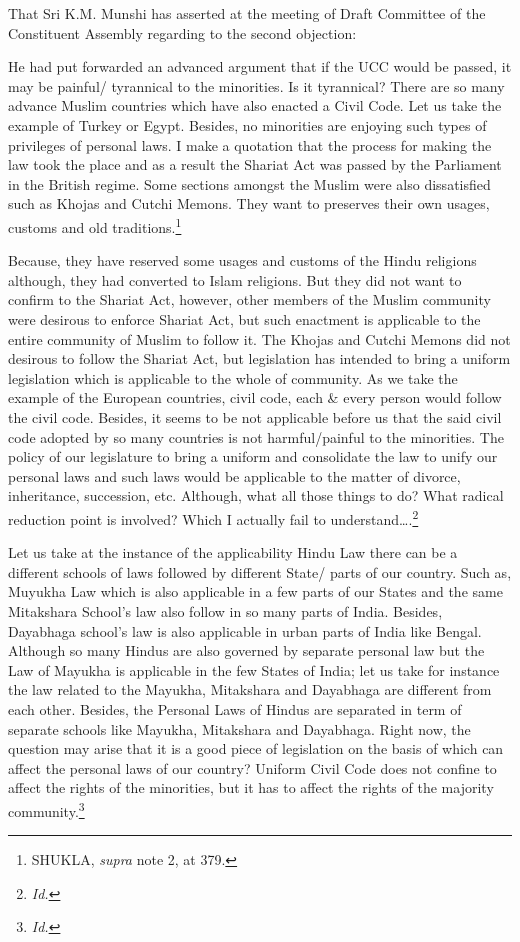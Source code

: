 \begin{multicols}{2}
\noi
That Sri K.M. Munshi has asserted at the meeting of Draft Committee of the Constituent
Assembly regarding to the second objection: 

\noi
He had put forwarded an advanced argument that if the UCC would be passed, it may be
painful/ tyrannical to the minorities. Is it tyrannical? There are so many advance Muslim
countries which have also enacted a Civil Code. Let us take the example of Turkey or Egypt.
Besides, no minorities are enjoying such types of privileges of personal laws. I make a
quotation that the process for making the law took the place and as a result the Shariat Act
was passed by the Parliament in the British regime. Some sections amongst the Muslim were
also dissatisfied such as Khojas and Cutchi Memons. They want to preserves their own
usages, customs and old traditions.\footnote{SHUKLA, {\it supra} note 2, at 379.}

\noi
Because, they have reserved some usages and customs of the Hindu religions although, they
had converted to Islam religions. But they did not want to confirm to the Shariat Act,
however, other members of the Muslim community were desirous to enforce Shariat Act, but
such enactment is applicable to the entire community of Muslim to follow it. The Khojas and
Cutchi Memons did not desirous to follow the Shariat Act, but legislation has intended to
bring a uniform legislation which is applicable to the whole of community. As we take the
example of the European countries, civil code, each \& every person would follow the civil
code. Besides, it seems to be not applicable before us that the said civil code adopted by so
many countries is not harmful/painful to the minorities. The policy of our legislature to bring
a uniform and consolidate the law to unify our personal laws and such laws would be
applicable to the matter of divorce, inheritance, succession, etc. Although, what all those things to do? What radical reduction point is involved? Which I actually fail to
understand….\footnote{\it Id.} 

\noi
Let us take at the instance of the applicability Hindu Law there can be a different schools of
laws followed by different State/ parts of our country. Such as, Muyukha Law which is also
applicable in a few parts of our States and the same Mitakshara School’s law also follow in
so many parts of India. Besides, Dayabhaga school’s law is also applicable in urban parts of
India like Bengal. Although so many Hindus are also governed by separate personal law but
the Law of Mayukha is applicable in the few States of India; let us take for instance the law
related to the Mayukha, Mitakshara and Dayabhaga are different from each other. Besides,
the Personal Laws of Hindus are separated in term of separate schools like Mayukha,
Mitakshara and Dayabhaga. Right now, the question may arise that it is a good piece of
legislation on the basis of which can affect the personal laws of our country? Uniform Civil
Code does not confine to affect the rights of the minorities, but it has to affect the rights of
the majority community.\footnote{\it Id.}


\end{multicols}

